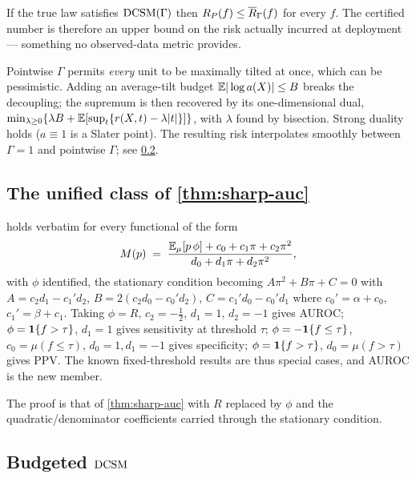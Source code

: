 \begin{corollary}
\label{cor:validity}
If the true law satisfies $\textup{DCSM}(\Gamma)$ then
$R_{P}(f) \le \overline{R}_\Gamma(f)$ for every $f$. The certified number is therefore
an upper bound on the risk actually incurred at deployment --- something no
observed-data metric provides.
\end{corollary}

\begin{remark}
\label{rem:budget}
Pointwise $\Gamma$ permits \emph{every} unit to be maximally tilted at once,
which can be pessimistic. Adding an average-tilt budget
$\mathbb{E}|\log a(X)|\le B$ breaks the decoupling; the supremum is then recovered by
its one-dimensional dual,
$\min_{\lambda\ge0}\{\lambda B + \mathbb{E}[\sup_t\{r(X,t)-\lambda|t|\}]\}$, with
$\lambda$ found by bisection. Strong duality holds ($a\equiv 1$ is a Slater
point). The resulting risk interpolates smoothly between $\Gamma=1$ and
pointwise $\Gamma$; see \cref{app:budget}.
\end{remark}

\subsection{The unified class of \cref{thm:sharp-auc}}
\label{app:unified}

\begin{proposition}
\label{prop:unified}
 holds verbatim for every functional of the form
\[
  M(p) \;=\;
  \frac{\mathbb{E}_\mu[p\,\phi] + c_0 + c_1\pi + c_2\pi^{2}}
       {d_0 + d_1\pi + d_2\pi^{2}},
\]
with $\phi$ identified, the stationary condition becoming
$A\pi^2+B\pi+C=0$ with $A=c_2d_1-c_1'd_2$, $B=2(c_2d_0-c_0'd_2)$,
$C=c_1'd_0-c_0'd_1$ where $c_0'=\alpha+c_0$, $c_1'=\beta+c_1$. Taking
$\phi=R,\,c_2=-\tfrac12,\,d_1=1,\,d_2=-1$ gives AUROC; $\phi=\mathbf{1}\{f>\tau\}$,
$d_1=1$ gives sensitivity at threshold $\tau$; $\phi=-\mathbf{1}\{f\le\tau\}$,
$c_0=\mu(f\le\tau)$, $d_0=1,d_1=-1$ gives specificity; $\phi=\mathbf{1}\{f>\tau\}$,
$d_0=\mu(f>\tau)$ gives PPV. The known fixed-threshold results are thus special
cases, and AUROC is the new member.
\end{proposition}

The proof is that of \cref{thm:sharp-auc} with $R$ replaced by $\phi$ and the
quadratic/denominator coefficients carried through the stationary condition.

\subsection{Budgeted \texorpdfstring{$\textup{DCSM}$}{DCSM}}
\label{app:budget}

